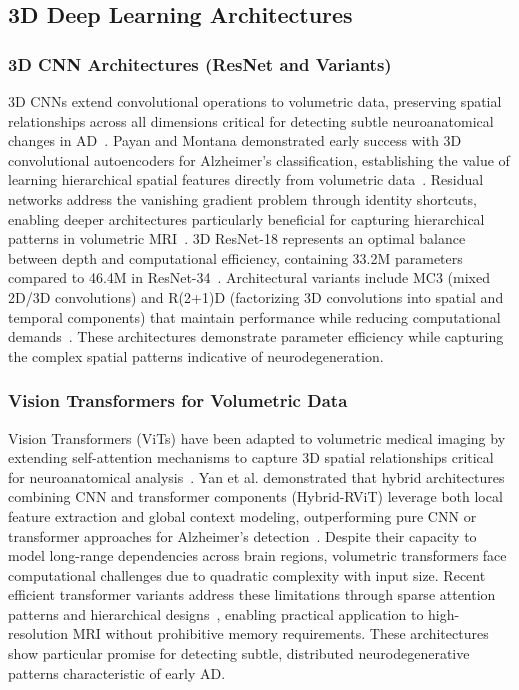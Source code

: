 \documentclass[12pt, a4paper]{article}
\begin{document}
\subsection{3D Deep Learning Architectures}

\subsubsection{3D CNN Architectures (ResNet and Variants)}

3D CNNs extend convolutional operations to volumetric data, preserving spatial relationships across all dimensions critical for detecting subtle neuroanatomical changes in AD~\cite{ebrahimi2020introducing}. Payan and Montana demonstrated early success with 3D convolutional autoencoders for Alzheimer's classification, establishing the value of learning hierarchical spatial features directly from volumetric data~\cite{payan2015predicting}. Residual networks address the vanishing gradient problem through identity shortcuts, enabling deeper architectures particularly beneficial for capturing hierarchical patterns in volumetric MRI~\cite{wu20223d}. 3D ResNet-18 represents an optimal balance between depth and computational efficiency, containing 33.2M parameters compared to 46.4M in ResNet-34~\cite{ebrahimi2020introducing}. Architectural variants include MC3 (mixed 2D/3D convolutions) and R(2+1)D (factorizing 3D convolutions into spatial and temporal components) that maintain performance while reducing computational demands~\cite{wu20223d}. These architectures demonstrate parameter efficiency while capturing the complex spatial patterns indicative of neurodegeneration.

\subsubsection{Vision Transformers for Volumetric Data}

Vision Transformers (ViTs) have been adapted to volumetric medical imaging by extending self-attention mechanisms to capture 3D spatial relationships critical for neuroanatomical analysis~\cite{lyu2022classification}. Yan et al. demonstrated that hybrid architectures combining CNN and transformer components (Hybrid-RViT) leverage both local feature extraction and global context modeling, outperforming pure CNN or transformer approaches for Alzheimer's detection~\cite{yan2025hybrid}. Despite their capacity to model long-range dependencies across brain regions, volumetric transformers face computational challenges due to quadratic complexity with input size. Recent efficient transformer variants address these limitations through sparse attention patterns and hierarchical designs~\cite{lu2025efficient}, enabling practical application to high-resolution MRI without prohibitive memory requirements. These architectures show particular promise for detecting subtle, distributed neurodegenerative patterns characteristic of early AD.
\end{document}
